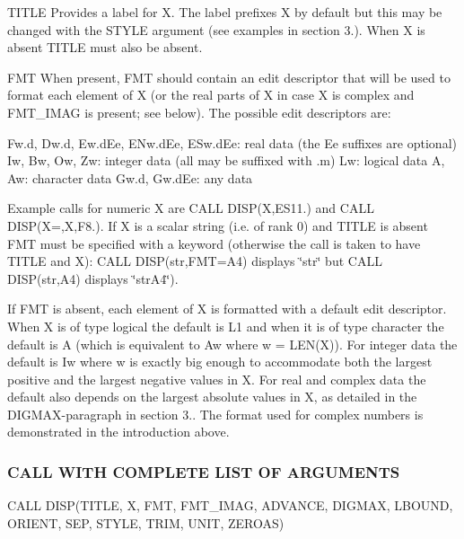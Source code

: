 T\+I\+T\+LE Provides a label for X. The label prefixes X by default but this may be changed with the S\+T\+Y\+LE argument (see examples in section 3.). When X is absent T\+I\+T\+LE must also be absent.

F\+MT When present, F\+MT should contain an edit descriptor that will be used to format each element of X (or the real parts of X in case X is complex and F\+M\+T\+\_\+\+I\+M\+AG is present; see below). The possible edit descriptors are\+:

Fw.\+d, Dw.\+d, Ew.\+d\+Ee, E\+Nw.\+d\+Ee, E\+Sw.\+d\+Ee\+: real data (the Ee suffixes are optional) Iw, Bw, Ow, Zw\+: integer data (all may be suffixed with .m) Lw\+: logical data A, Aw\+: character data Gw.\+d, Gw.\+d\+Ee\+: any data

Example calls for numeric X are C\+A\+LL D\+I\+SP(X,\textquotesingle{}E\+S11.\textquotesingle{}) and C\+A\+LL D\+I\+SP(\textquotesingle{}X=\textquotesingle{},X,\textquotesingle{}F8.\textquotesingle{}). If X is a scalar string (i.\+e. of rank 0) and T\+I\+T\+LE is absent F\+MT must be specified with a keyword (otherwise the call is taken to have T\+I\+T\+LE and X)\+: C\+A\+LL D\+I\+SP(\textquotesingle{}str\textquotesingle{},F\+MT=\textquotesingle{}A4\textquotesingle{}) displays \char`\"{}str\char`\"{} but C\+A\+LL D\+I\+SP(\textquotesingle{}str\textquotesingle{},\textquotesingle{}A4\textquotesingle{}) displays \char`\"{}str\+A4\char`\"{}).

If F\+MT is absent, each element of X is formatted with a default edit descriptor. When X is of type logical the default is L1 and when it is of type character the default is A (which is equivalent to Aw where w = L\+E\+N(\+X)). For integer data the default is Iw where w is exactly big enough to accommodate both the largest positive and the largest negative values in X. For real and complex data the default also depends on the largest absolute values in X, as detailed in the D\+I\+G\+M\+A\+X-\/paragraph in section 3.. The format used for complex numbers is demonstrated in the introduction above.

\subsubsection*{C\+A\+LL W\+I\+TH C\+O\+M\+P\+L\+E\+TE L\+I\+ST OF A\+R\+G\+U\+M\+E\+N\+TS}

\begin{DoxyVerb}   CALL DISP(TITLE, X, FMT, FMT_IMAG, ADVANCE, DIGMAX, LBOUND, ORIENT,
   SEP, STYLE, TRIM, UNIT, ZEROAS)
\end{DoxyVerb}


